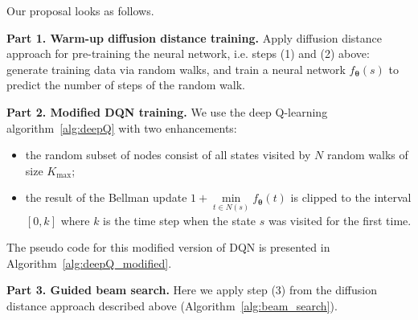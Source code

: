\documentclass[reqno,11pt]{amsart}
\begin{document}
Our proposal looks as follows.

{\bf Part 1. Warm-up diffusion distance training.} Apply diffusion distance approach for pre-training the neural network, i.e. steps (1) and (2) above: generate training data via random walks, and train a neural network $f_{\boldsymbol \theta}(s)$ to predict the number of steps of the random walk.

{\bf Part 2. Modified DQN training.} We use the deep Q-learning algorithm~\ref{alg:deepQ} with two enhancements:

\begin{itemize}
    \item 
    the random subset of nodes consist of all states visited by $N$ random walks of size $K_{\max}$;
    \item 
    the result of the Bellman update $1 + \min\limits_{t \in N(s)}f_{\boldsymbol \theta}(t)$ is clipped to the interval $[0, k]$ where $k$ is the time step when the state $s$ was visited for the first time.
\end{itemize}

The pseudo code for this modified version of DQN is presented in Algorithm~\ref{alg:deepQ_modified}.






{\bf Part 3. Guided beam search.} Here we apply step (3) from the diffusion distance approach described above (Algorithm~\ref{alg:beam_search}).
\end{document}
